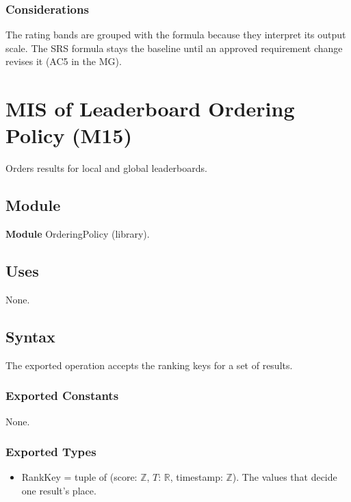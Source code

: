 \documentclass[12pt, titlepage]{article}
\begin{document}
\subsubsection{Considerations}

The rating bands are grouped with the formula because they interpret its
output scale. The SRS formula stays the baseline until an approved requirement
change revises it (AC5 in the MG).

\newpage
\section{MIS of Leaderboard Ordering Policy (M15)} \label{sec:M15}

Orders results for local and global leaderboards.

\subsection{Module}

\textbf{Module} OrderingPolicy (library).

\subsection{Uses}

None.

\subsection{Syntax}

The exported operation accepts the ranking keys for a set of results.

\subsubsection{Exported Constants}

None.

\subsubsection{Exported Types}

\begin{itemize}
\item RankKey = tuple of (score: $\mathbb{Z}$, $T$: $\mathbb{R}$, timestamp:
  $\mathbb{Z}$). The values that decide one result's place.
\end{itemize}
\end{document}
